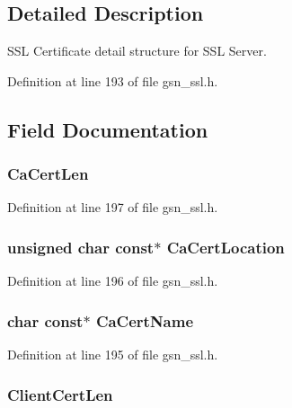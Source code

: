 \subsection{Detailed Description}
SSL Certificate detail structure for SSL Server. 

Definition at line 193 of file gsn\_\-ssl.h.



\subsection{Field Documentation}
\hypertarget{a00459_a05a7cb062be3de800ccb2229d9390c89}{
\subsubsection[{CaCertLen}]{ {\bf CaCertLen}}}
\label{a00459_a05a7cb062be3de800ccb2229d9390c89}


Definition at line 197 of file gsn\_\-ssl.h.

\hypertarget{a00459_a6b471671a19ca86a86b8a4d03eb1d734}{
\subsubsection[{CaCertLocation}]{\setlength{\rightskip}{0pt plus 5cm}unsigned char const$\ast$ {\bf CaCertLocation}}}
\label{a00459_a6b471671a19ca86a86b8a4d03eb1d734}


Definition at line 196 of file gsn\_\-ssl.h.

\hypertarget{a00459_a35fa49b31ae551ffed3a976202888be0}{
\subsubsection[{CaCertName}]{\setlength{\rightskip}{0pt plus 5cm}char const$\ast$ {\bf CaCertName}}}
\label{a00459_a35fa49b31ae551ffed3a976202888be0}


Definition at line 195 of file gsn\_\-ssl.h.

\hypertarget{a00459_a4938ca533f0444591a80f068314d1575}{
\subsubsection[{ClientCertLen}]{ {\bf ClientCertLen}}}
\label{a00459_a4938ca533f0444591a80f068314d1575}



